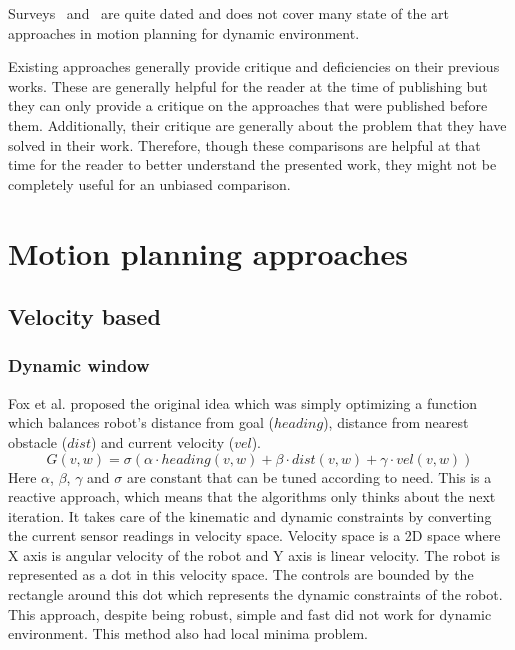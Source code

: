 Surveys~\cite{fujimura1991motion} and~\cite{tsubouchi1996motion} are quite dated and does not 
cover many state of the art approaches in motion planning for dynamic environment.

Existing approaches generally provide critique and deficiencies on their previous works. These are 
generally helpful for the reader at the time of publishing but they can only provide a critique on 
the approaches that were published before them. Additionally, their critique are generally about 
the problem that they have solved in their work. Therefore, though these comparisons are helpful 
at that time for the reader to better understand the presented work, they might not be completely 
useful for an unbiased comparison.

\section{Motion planning approaches}%
\label{sec:motion_planning_approaches}

\subsection{Velocity based}%
\label{sub:velocity_based}

\subsubsection{Dynamic window}%
\label{subsub:dynamic_window}

Fox et al.\cite{fox1997dynamic} proposed the original idea which was simply optimizing a function which balances robot's distance from goal ($heading$), distance from nearest obstacle ($dist$) and current velocity ($vel$).  $$ G(v,w)= \sigma(\alpha \cdot  heading(v,w) +\beta \cdot dist(v,w) + \gamma \cdot vel(v,w)) $$
    Here $\alpha$, $\beta$, $\gamma$ and $\sigma$ are constant that can be tuned according to need.
This is a reactive approach, which means that the algorithms only thinks about the next iteration.
It takes care of the kinematic and dynamic constraints by converting the current sensor readings in velocity space.
Velocity space is a 2D space where X axis is angular velocity of the robot and Y axis is linear velocity.
The robot is represented as a dot in this velocity space. The controls are bounded by the rectangle around this dot which represents the dynamic constraints of the robot.
This approach, despite being robust, simple and fast did not work for dynamic environment. This method also had local minima problem.

